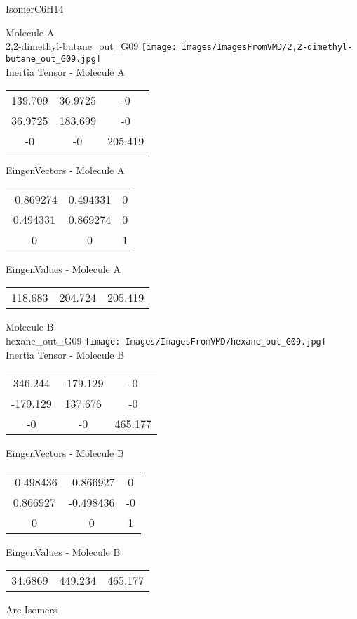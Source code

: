 \vtab[-2cm]
\begin{center}
{\large IsomerC6H14}
\end{center}
\begin{multicols}{2}
\begin{center}
Molecule A \\ 
2,2-dimethyl-butane\_out\_G09
\texttt{[image: Images/ImagesFromVMD/2,2-dimethyl-butane\_out\_G09.jpg]}
\\
Inertia Tensor - Molecule A \\
\vtab
\begin{tabular}{|c c c|}
139.709	 & 	36.9725	 & 	-0	 \\
36.9725	 & 	183.699	 & 	-0	 \\
-0	 & 	-0	 & 	205.419
\end{tabular}

\vtab
 EingenVectors - Molecule A     \\
\vtab
\begin{tabular}{|c c c|}
-0.869274	 & 	0.494331	 & 	0	 \\
0.494331	 & 	0.869274	 & 	0	 \\
0	 & 	0	 & 	1
\end{tabular}

\vtab
 EingenValues - Molecule A     \\
\vtab
\begin{tabular}{|c c c|}
118.683	 & 	204.724	 & 	205.419
\end{tabular}
\columnbreak

Molecule B \\ 
hexane\_out\_G09
\texttt{[image: Images/ImagesFromVMD/hexane\_out\_G09.jpg]}
\\
Inertia Tensor - Molecule B \\
\vtab
\begin{tabular}{|c c c|}
346.244	 & 	-179.129	 & 	-0	 \\
-179.129	 & 	137.676	 & 	-0	 \\
-0	 & 	-0	 & 	465.177
\end{tabular}

\vtab
 EingenVectors - Molecule B     \\
\vtab
\begin{tabular}{|c c c|}
-0.498436	 & 	-0.866927	 & 	0	 \\
0.866927	 & 	-0.498436	 & 	-0	 \\
0	 & 	0	 & 	1
\end{tabular}

\vtab
 EingenValues - Molecule B     \\
\vtab
\begin{tabular}{|c c c|}
34.6869	 & 	449.234	 & 	465.177
\end{tabular}

\end{center}
\end{multicols}
\begin{center}
\vtab
\vtab
\textcolor{NavyBlue}{\Large Are Isomers}
\end{center}
\newpage

